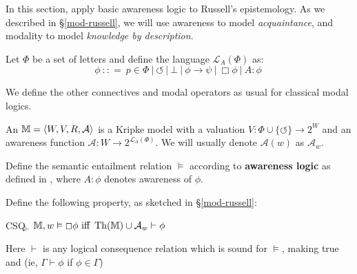 In this section, apply basic awareness logic to Russell's
epistemology.  As we described in \S\ref{mod-russell}, we will use
awareness to model \emph{acquaintance}, and modality to model \emph{knowledge by description}.

\begin{definition}
  Let $\Phi$ be a set of letters and define the language $\mathcal{L}_A
  (\Phi)$ as:
  \[ \phi \  : : = \  p \in \Phi \  |
     \  \circlearrowleft \  | \  \bot
     \  | \  \phi \rightarrow \psi \  |
     \  \Box \phi \  | \  A : \phi \ 
  \]
\end{definition}

We define the other connectives and modal operators as usual for classical
modal logics.

\begin{definition}
  \label{awarenessmodels0}An {} $\mathbbm{M}= \langle
  W, V, R, \mathcal{A} \rangle$ is a Kripke model with a valuation $V : \Phi
  \cup \{\circlearrowleft\} \rightarrow 2^W$ and an awareness function
  $\mathcal{A} : W \rightarrow 2^{\mathcal{L}_A (\Phi)}$.  We will usually
  denote $\mathcal{A} (w)$ as $\mathcal{A}_w$.
  
  Define the semantic entailment relation $\vDash$ according to
  \textbf{awareness logic} as defined in \cite{fagin_belief_1988},
  where $A : \phi$ denotes awareness of $\phi$. 
\end{definition}

Define the following property, as sketched in \S\ref{mod-russell}:

\begin{definition}
  \begin{descriptiondash}
    \item[CSQ$_\vdash$] $\mathbbm{M}, w \vDash \Box \phi \text{ iff } \tmop{Th}
    (\mathbbm{M}) \cup \mathcal{A}_w \vdash \phi$
  \end{descriptiondash}
  
  Here $\vdash$ is any logical consequence relation which is sound for
  $\vDash$, making true \tmtextbf{modus ponens} and  (ie,
  $\Gamma \vdash \phi$ if $\phi \in \Gamma$)
\end{definition}

